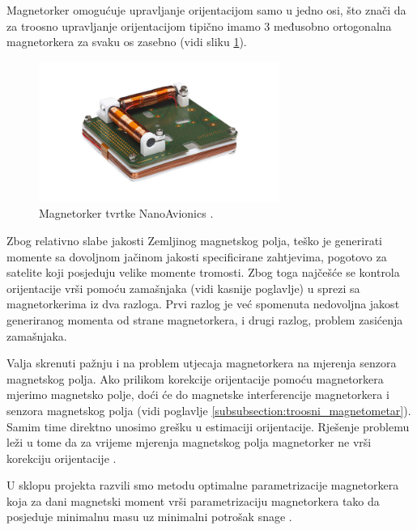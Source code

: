 \documentclass[times, utf8, diplomski, numeric]{templates/template}
\begin{document}
{{{{                Magnetorker omogućuje upravljanje orijentacijom samo u jedno osi, što znači da za troosno upravljanje orijentacijom tipično imamo 3 međusobno ortogonalna magnetorkera za svaku os zasebno (vidi sliku \ref{fig:magnetorquer_img}).

                \begin{figure}[htb]
                \centering
                \includegraphics[width=0.7\textwidth]{images/magnetorquer_img.jpg}
                \caption{Magnetorker tvrtke NanoAvionics \cite{magnetorquer_cite}.}
                \label{fig:magnetorquer_img}
                \end{figure}

                Zbog relativno slabe jakosti Zemljinog magnetskog polja, teško je generirati momente sa dovoljnom jačinom jakosti specificirane zahtjevima, pogotovo za satelite koji posjeduju velike momente tromosti. Zbog toga najčešće se kontrola orijentacije vrši pomoću zamašnjaka (vidi kasnije poglavlje) u sprezi sa magnetorkerima iz dva razloga. Prvi razlog je već spomenuta nedovoljna jakost generiranog momenta od strane magnetorkera, i drugi razlog, problem zasićenja zamašnjaka.

                Valja skrenuti pažnju i na problem utjecaja magnetorkera na mjerenja senzora magnetskog polja. Ako prilikom korekcije orijentacije pomoću magnetorkera mjerimo magnetsko polje, doći će do magnetske interferencije magnetorkera i senzora magnetskog polja (vidi poglavlje \ref{subsubsection:troosni_magnetometar}). Samim time direktno unosimo grešku u estimaciji orijentacije. Rješenje problemu leži u tome da za vrijeme mjerenja magnetskog polja magnetorker ne vrši korekciju orijentacije \cite{adcsKnjiga}.

                U sklopu projekta razvili smo metodu optimalne parametrizacije magnetorkera koja za dani magnetski moment vrši parametrizaciju magnetorkera tako da posjeduje minimalnu masu uz minimalni potrošak snage \cite{magnetorker_ieee}.
            }

}}}
\end{document}
